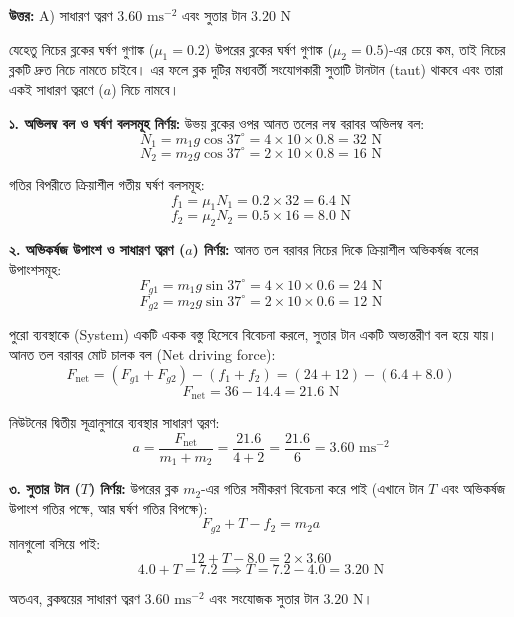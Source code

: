 \documentclass[12pt, a4paper]{article}
\begin{document}
\vspace{0.5em}
\begin{tcolorbox}[answerbox]
\textbf{\color{success} উত্তর:} A) সাধারণ ত্বরণ $3.60\text{ ms}^{-2}$ এবং সুতার টান $3.20\text{ N}$
\end{tcolorbox}
\vspace{1em}

\begin{tcolorbox}[solutionbox={সমাধান (Solution)}]
\noindent
যেহেতু নিচের ব্লকের ঘর্ষণ গুণাঙ্ক ($\mu_1 = 0.2$) উপরের ব্লকের ঘর্ষণ গুণাঙ্ক ($\mu_2 = 0.5$)-এর চেয়ে কম, তাই নিচের ব্লকটি দ্রুত নিচে নামতে চাইবে। এর ফলে ব্লক দুটির মধ্যবর্তী সংযোগকারী সুতাটি টানটান (taut) থাকবে এবং তারা একই সাধারণ ত্বরণে ($a$) নিচে নামবে।

\vspace{0.5em}
\textbf{১. অভিলম্ব বল ও ঘর্ষণ বলসমূহ নির্ণয়:}
উভয় ব্লকের ওপর আনত তলের লম্ব বরাবর অভিলম্ব বল:
$$N_1 = m_1 g \cos 37^\circ = 4 \times 10 \times 0.8 = 32\text{ N}$$
$$N_2 = m_2 g \cos 37^\circ = 2 \times 10 \times 0.8 = 16\text{ N}$$

গতির বিপরীতে ক্রিয়াশীল গতীয় ঘর্ষণ বলসমূহ:
$$f_1 = \mu_1 N_1 = 0.2 \times 32 = 6.4\text{ N}$$
$$f_2 = \mu_2 N_2 = 0.5 \times 16 = 8.0\text{ N}$$

\vspace{0.5em}
\textbf{২. অভিকর্ষজ উপাংশ ও সাধারণ ত্বরণ ($a$) নির্ণয়:}
আনত তল বরাবর নিচের দিকে ক্রিয়াশীল অভিকর্ষজ বলের উপাংশসমূহ:
$$F_{g1} = m_1 g \sin 37^\circ = 4 \times 10 \times 0.6 = 24\text{ N}$$
$$F_{g2} = m_2 g \sin 37^\circ = 2 \times 10 \times 0.6 = 12\text{ N}$$

পুরো ব্যবস্থাকে (System) একটি একক বস্তু হিসেবে বিবেচনা করলে, সুতার টান একটি অভ্যন্তরীণ বল হয়ে যায়। আনত তল বরাবর মোট চালক বল (Net driving force):
$$F_{\text{net}} = (F_{g1} + F_{g2}) - (f_1 + f_2) = (24 + 12) - (6.4 + 8.0)$$
$$F_{\text{net}} = 36 - 14.4 = 21.6\text{ N}$$

নিউটনের দ্বিতীয় সূত্রানুসারে ব্যবস্থার সাধারণ ত্বরণ:
$$a = \frac{F_{\text{net}}}{m_1 + m_2} = \frac{21.6}{4 + 2} = \frac{21.6}{6} = 3.60\text{ ms}^{-2}$$

\vspace{0.5em}
\textbf{৩. সুতার টান ($T$) নির্ণয়:}
উপরের ব্লক $m_2$-এর গতির সমীকরণ বিবেচনা করে পাই (এখানে টান $T$ এবং অভিকর্ষজ উপাংশ গতির পক্ষে, আর ঘর্ষণ গতির বিপক্ষে):
$$F_{g2} + T - f_2 = m_2 a$$
মানগুলো বসিয়ে পাই:
$$12 + T - 8.0 = 2 \times 3.60$$
$$4.0 + T = 7.2 \implies T = 7.2 - 4.0 = 3.20\text{ N}$$

অতএব, ব্লকদ্বয়ের সাধারণ ত্বরণ $3.60\text{ ms}^{-2}$ এবং সংযোজক সুতার টান $3.20\text{ N}$।
\end{tcolorbox}
\vspace{1em}
\end{document}
